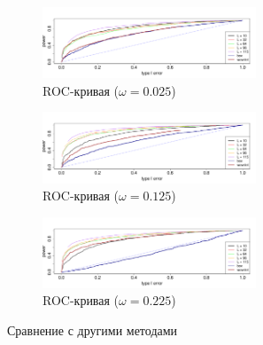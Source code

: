 \documentclass[specialist,
substylefile = spbu_report.rtx,
subf,href,colorlinks=true, 12pt]{disser}
\theoremstyle{definition}
\begin{document}
\begin{figure}[h!]
	\begin{subfigure}[t]{\textwidth}
		\centering
		\includegraphics[width=0.7\textwidth]{img/roc_testAR_omega0025.pdf}
		\caption{ROC-кривая ($\omega=0.025$)}
		\label{roc_testAR_omega0025}
	\end{subfigure}
	\begin{subfigure}[t]{\textwidth}
		\centering
		\includegraphics[width=0.7\textwidth]{img/roc_testAR_omega0125.pdf}
		\caption{ROC-кривая ($\omega=0.125$)}
		\label{roc_testAR_omega0125}
	\end{subfigure}
	\begin{subfigure}[t]{\textwidth}
		\centering
		\includegraphics[width=0.7\textwidth]{img/roc_testAR_omega0225.pdf}
		\caption{ROC-кривая ($\omega=0.225$)}
		\label{roc_testAR_omega0225}
	\end{subfigure}
	\caption{Сравнение с другими методами}
\end{figure}
\end{document}
